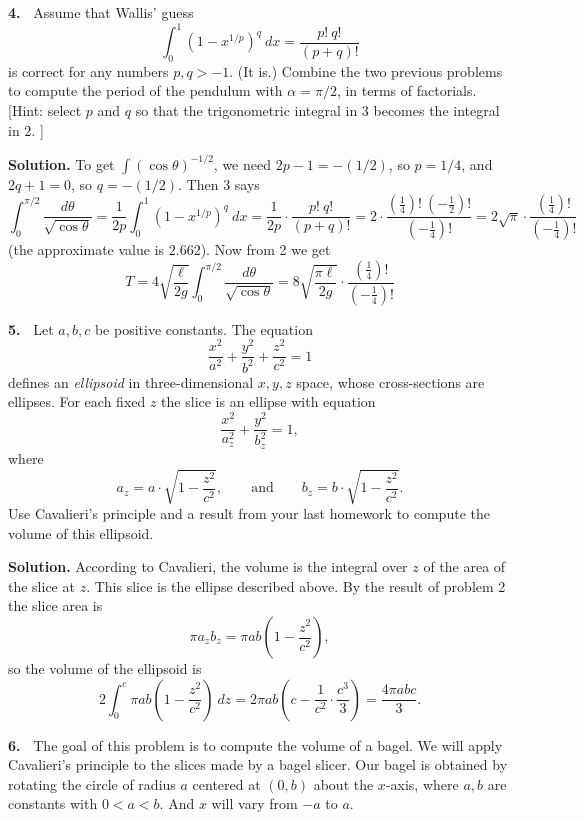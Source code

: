 \documentclass[12pt]{article}
\newcommand{\al}{\alpha}
\theoremstyle{definition}
\theoremstyle{remark}
\theoremstyle{definition}
\newenvironment{Solution}{\noindent\textbf{Solution.}}{}
\begin{document}
{\bf 4.\ } Assume that Wallis' guess 
\[
\int_0^1(1-x^{1/p})^q\ dx=\frac{p!\ q!}{(p+q)!}
\]
is correct for any numbers $p,q>-1$. (It is.) Combine the two previous problems to compute the period of the pendulum with $\al=\pi/2$, in terms of factorials. [Hint: select $p$ and $q$ so that the trigonometric integral in 3 becomes the integral in 2. ]

\begin{Solution} To get $\int(\cos \theta)^{-1/2}$, we need $2p-1=-(1/2)$, so $p=1/4$, and $2q+1=0$, so $q=-(1/2)$. Then 3 says 
\[\int_0^{\pi/2}
\frac{d\theta}{\sqrt{\cos\theta}}=
\frac{1}{2p}\int_0^1(1-x^{1/p})^q\ dx=
\frac{1}{2p}\cdot \frac{p!\ q!}{(p+q)!}=
2\cdot\frac{\left(\frac{1}{4}\right)!\ \left(-\frac{1}{2}\right)!}
{\left(-\frac{1}{4}\right)!}=
2\sqrt{\pi}\cdot\frac{\left(\frac{1}{4}\right)!}
{\left(-\frac{1}{4}\right)!}
\]
(the approximate value is $2.662$).
Now from 2 we get
\[
T=4\sqrt{\frac{\ell}{2g}}\int_0^{\pi/2}
\frac{d\theta}{\sqrt{\cos\theta}}=
8\sqrt{\frac{\pi\ell}{2g}}\cdot\frac{\left(\frac{1}{4}\right)!}
{\left(-\frac{1}{4}\right)!}
\]

\end{Solution}

{\bf 5.\ } Let $a,b,c$ be positive constants. The equation 
\[\frac{x^2}{a^2}+\frac{y^2}{b^2}+\frac{z^2}{c^2}=1\]
defines an {\it ellipsoid} in three-dimensional $x,y,z$ space, whose  cross-sections are ellipses.
For each fixed $z$ the slice is an ellipse with equation
\[\frac{x^2}{a_z^2}+\frac{y^2}{b_z^2}=1,\]
where 
\[a_z=a\cdot\sqrt{1-\frac{z^2}{c^2}},\qquad \text{and}\qquad 
b_z=b\cdot\sqrt{1-\frac{z^2}{c^2}}.
\]
Use Cavalieri's principle and a result from your last homework to compute the volume of this ellipsoid. 

\begin{Solution} 
According to Cavalieri, the volume is the integral over $z$ of the area of the slice at $z$. This slice is the ellipse described above. By the result of problem 2 the slice area is 
\[\pi a_z b_z=\pi a b\left(1-\frac{z^2}{c^2}\right),\]
so the volume of the ellipsoid is 
\[
2\int_0^c\pi a b\left(1-\frac{z^2}{c^2}\right)\ dz=
2\pi a b\left(c-\frac{1}{c^2}\cdot \frac{c^3}{3}\right)=
\frac{4\pi a b c}{3}.
\]

\end{Solution} 

{\bf 6.\ } The goal of this problem is to compute the volume of a bagel. We will  apply Cavalieri's principle to the slices made by a bagel slicer. Our bagel is obtained by rotating the circle of radius $a$ centered at $(0,b)$ about the $x$-axis, where $a,b$ are constants with $0<a<b$. And $x$ will vary from $-a$ to $a$. 
\end{document}
